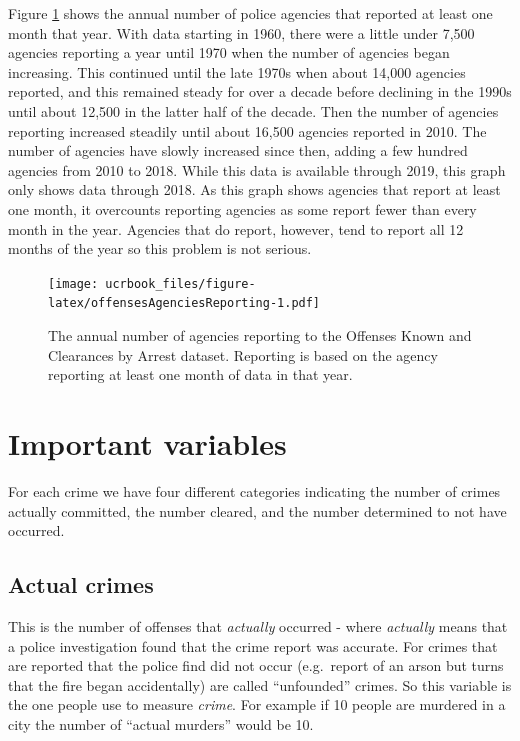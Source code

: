 \documentclass[
  12pt,
  openany]{book}
\begin{document}
Figure \ref{fig:offensesAgenciesReporting} shows the annual number of police agencies that reported at least one month that year. With data starting in 1960, there were a little under 7,500 agencies reporting a year until 1970 when the number of agencies began increasing. This continued until the late 1970s when about 14,000 agencies reported, and this remained steady for over a decade before declining in the 1990s until about 12,500 in the latter half of the decade. Then the number of agencies reporting increased steadily until about 16,500 agencies reported in 2010. The number of agencies have slowly increased since then, adding a few hundred agencies from 2010 to 2018. While this data is available through 2019, this graph only shows data through 2018. As this graph shows agencies that report at least one month, it overcounts reporting agencies as some report fewer than every month in the year. Agencies that do report, however, tend to report all 12 months of the year so this problem is not serious.

\begin{figure}
\centering
\texttt{[image: ucrbook\_files/figure-latex/offensesAgenciesReporting-1.pdf]}
\caption{\label{fig:offensesAgenciesReporting}The annual number of agencies reporting to the Offenses Known and Clearances by Arrest dataset. Reporting is based on the agency reporting at least one month of data in that year.}
\end{figure}

\hypertarget{important-variables}{%
\section{Important variables}\label{important-variables}}

For each crime we have four different categories indicating the number of crimes actually committed, the number cleared, and the number determined to not have occurred.

\hypertarget{actual-crimes}{%
\subsection{Actual crimes}\label{actual-crimes}}

This is the number of offenses that \emph{actually} occurred - where \emph{actually} means that a police investigation found that the crime report was accurate. For crimes that are reported that the police find did not occur (e.g.~report of an arson but turns that the fire began accidentally) are called ``unfounded'' crimes. So this variable is the one people use to measure \emph{crime}. For example if 10 people are murdered in a city the number of ``actual murders'' would be 10.
\end{document}

